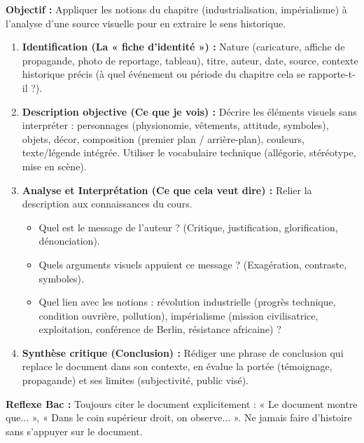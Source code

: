 \documentclass[11pt]{article}
\newcommand{\cle}[1]{{\popxbold\color{popdark}#1}}
\begin{document}
\begin{methode}
\textbf{Objectif :} Appliquer les notions du chapitre (industrialisation, impérialisme) à l'analyse d'une source visuelle pour en extraire le sens historique.
\begin{enumerate}
    \item \textbf{Identification (La « fiche d'identité ») :} Nature (caricature, affiche de propagande, photo de reportage, tableau), titre, auteur, date, source, contexte historique précis (à quel événement ou période du chapitre cela se rapporte-t-il ?).
    \item \textbf{Description objective (Ce que je vois) :} Décrire les éléments visuels sans interpréter : personnages (physionomie, vêtements, attitude, symboles), objets, décor, composition (premier plan / arrière-plan), couleurs, texte/légende intégrée. Utiliser le vocabulaire technique (\cle{allégorie}, \cle{stéréotype}, \cle{mise en scène}).
    \item \textbf{Analyse et Interprétation (Ce que cela veut dire) :} Relier la description aux connaissances du cours.
    \begin{itemize}
        \item Quel est le \cle{message} de l'auteur ? (Critique, justification, glorification, dénonciation).
        \item Quels \cle{arguments} visuels appuient ce message ? (Exagération, contraste, symboles).
        \item Quel lien avec les notions : \cle{révolution industrielle} (progrès technique, condition ouvrière, pollution), \cle{impérialisme} (mission civilisatrice, exploitation, conférence de Berlin, résistance africaine) ?
    \end{itemize}
    \item \textbf{Synthèse critique (Conclusion) :} Rédiger une phrase de conclusion qui replace le document dans son contexte, en évalue la portée (témoignage, propagande) et ses limites (subjectivité, public visé).
\end{enumerate}
\textbf{Reflexe Bac :} Toujours citer le document explicitement : « Le document montre que... », « Dans le coin supérieur droit, on observe... ». Ne jamais faire d'histoire sans s'appuyer sur le document.
\end{methode}
\end{document}
